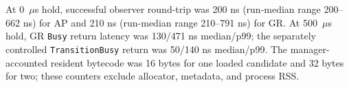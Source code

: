 At 0~$\mu$s hold, successful observer round-trip was 200 ns (run-median range 200--662 ns) for AP and 210 ns (run-median range 210--791 ns) for GR. At 500~$\mu$s hold, GR \texttt{Busy} return latency was 130/471 ns median/p99; the separately controlled \texttt{TransitionBusy} return was 50/140 ns median/p99. The manager-accounted resident bytecode was 16 bytes for one loaded candidate and 32 bytes for two; these counters exclude allocator, metadata, and process RSS.
